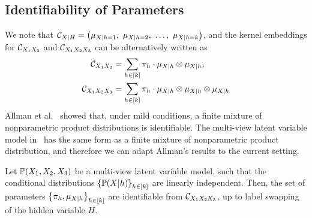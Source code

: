 \documentclass{article}
\begin{document}
\subsection{Identifiability of Parameters}

We note that $\mathcal{C}_{X|H} = \left(\mu_{X|h=1},\ \mu_{X|h=2},\ \ldots,\ \mu_{X|h=k}\right)$, and the kernel embeddings for $\mathcal{C}_{X_1 X_2}$ and $\mathcal{C}_{X_1 X_2 X_3}$ can be alternatively written as
\begin{align}
	\mathcal{C}_{X_1 X_2}
  & = \sum_{h \in [k]} \pi_h\cdot \mu_{X|h} \otimes \mu_{X|h}, \label{eq:joint2} \\
  \mathcal{C}_{X_1 X_2 X_3}
  &= \sum_{h \in [k]} \pi_h\cdot \mu_{X|h} \otimes \mu_{X|h} \otimes \mu_{X|h} \label{eq:joint3}
\end{align}
Allman et al.~\cite{Allman09} showed that, under mild conditions, a finite mixture of nonparametric product distributions is identifiable. The multi-view latent variable model in~ has the same form as a finite mixture of nonparametric product distribution, and therefore we can adapt Allman's results to the current setting.
\begin{proposition}[Identifiability]\label{prop:identifiability}
\vspace{-2mm}
  Let $\mathbb{P}(X_1,X_2,X_3)$ be a multi-view latent variable model, such that the conditional distributions $\left\{\mathbb{P}(X|h)\right\}_{h \in [k]}$ are linearly independent. Then, the set of parameters $\left\{\pi_h, \mu_{X|h}\right\}_{h \in [k]}$ are identifiable from $\mathcal{C}_{X_1 X_2 X_3}$, up to label swapping of the hidden variable $H$.
\vspace{-2mm}
\end{proposition}


\end{document}
